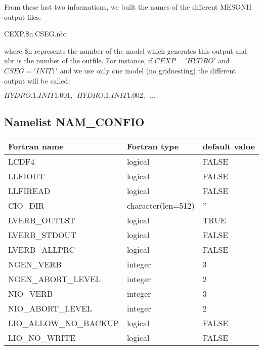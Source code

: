 From these last two informations, we built the names of the different MESONH
output files: 

CEXP.\$n.CSEG.nbr

where \$n represents the number of the model which generates this output and nbr
is the number of the outfile. For instance, if $CEXP='HYDRO'$ and $CSEG='INIT1'$
and we use only  one model (no gridnesting) the different output will be called:

$HYDRO.1.INIT1.001 , \ \ HYDRO.1.INIT1.002, \ \ \ldots$
\subsection{Namelist NAM\_CONFIO}\label{s:namconfio}

\begin{center}
\begin{tabular} {|l|l|l|}
\hline
Fortran name & Fortran type & default value \\
\hline
LCDF4      & logical  & FALSE  \\
LLFIOUT    & logical  & FALSE  \\
LLFIREAD   & logical  & FALSE  \\
\hline
CIO\_DIR & character(len=512) & '' \\
\hline
LVERB\_OUTLST      & logical & TRUE  \\
LVERB\_STDOUT      & logical & FALSE \\
LVERB\_ALLPRC      & logical & FALSE \\
NGEN\_VERB         & integer & 3 \\
NGEN\_ABORT\_LEVEL & integer & 2 \\
NIO\_VERB          & integer & 3 \\
NIO\_ABORT\_LEVEL  & integer & 2 \\
\hline
LIO\_ALLOW\_NO\_BACKUP & logical & FALSE \\
LIO\_NO\_WRITE         & logical & FALSE \\
\hline
\end{tabular}
\end{center}


